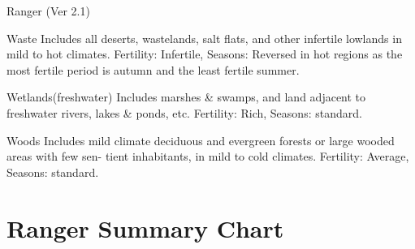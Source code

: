 \begin{Chapter}{Ranger (Ver 2.1)}
\begin{Description}
\item[Waste] Includes all deserts, wastelands, salt flats, and other
  infertile lowlands in mild to hot climates.  Fertility: Infertile,
  Seasons: Reversed in hot regions as the most fertile period is
  autumn and the least fertile summer.

\item[Wetlands(freshwater) ] Includes marshes \& swamps, and land
  adjacent to freshwater rivers, lakes \& ponds, etc.  Fertility:
  Rich, Seasons: standard.

\item[Woods] Includes mild climate deciduous and evergreen forests or
  large wooded areas with few sen- tient inhabitants, in mild to cold
  climates. Fertility: Average, Seasons: standard.

\end{Description}

\begin{table*}[t]
\section{Ranger Summary Chart}

\medskip


\end{table*}
\end{Chapter}
